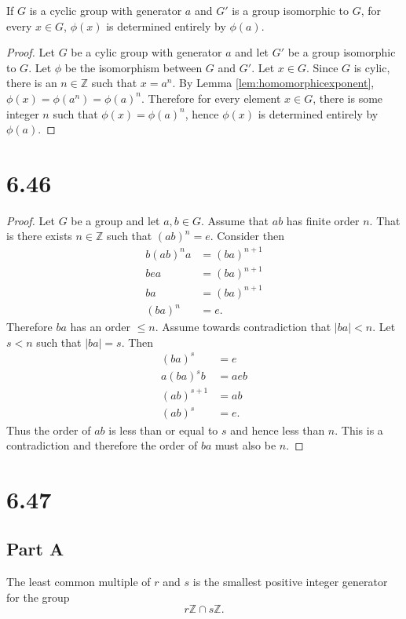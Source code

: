 \documentclass[12pt]{extarticle}
\begin{document}
\begin{theorem}
	If $G$ is a cyclic group with generator $a$ and $G'$ is a group isomorphic to $G$, for every $x \in G$, $\phi(x)$ is determined entirely by $\phi(a)$.
\end{theorem}
\begin{proof}
	Let $G$ be a cylic group with generator $a$ and let $G'$ be a group isomorphic to $G$. Let $\phi$ be the isomorphism between $G$ and $G'$. Let $x \in G$. Since $G$ is cylic, there is an $n \in \mathbb{Z}$ such that $x = a^n$. By Lemma \ref{lem:homomorphicexponent}, $\phi(x) = \phi(a^n) = \phi(a)^n$. Therefore for every element $x \in G$, there is some integer $n$ such that $\phi(x) = \phi(a)^n$, hence $\phi(x)$ is determined entirely by $\phi(a)$.
\end{proof}

\section*{6.46}
\begin{proof}
	Let $G$ be a group and let $a,b \in G$. Assume that $ab$ has finite order $n$. That is there exists $n \in \mathbb{Z}$ such that $(ab)^n = e$. Consider then
	\begin{align*}
		b (ab)^n a &= (ba)^{n+1} \\
		b e a &= (ba)^{n+1} \\
		ba &= (ba)^{n+1} \\
		(ba)^n &= e
	.\end{align*}
	Therefore $ba$ has an order $\leq n$. Assume towards contradiction that $|ba| < n$. Let $s < n$ such that $|ba| = s$. Then
	\begin{align*}
		(ba)^s &= e \\
		a(ba)^s b &= aeb \\
		(ab)^{s+1} &= ab \\
		(ab)^s &= e
	.\end{align*}
	Thus the order of $ab$ is less than or equal to $s$ and hence less than $n$. This is a contradiction and therefore the order of $ba$ must also be $n$.
\end{proof}

\section*{6.47}
\subsection*{Part A}
The least common multiple of $r$ and $s$ is the smallest positive integer generator for the group
\[
	r \mathbb{Z} \cap s \mathbb{Z}
.\]
\end{document}
